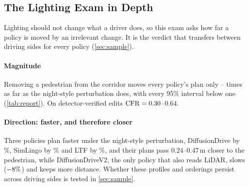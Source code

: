 \subsection{The Lighting Exam in Depth}
\label{sec:lighting}

Lighting should not change what a driver does, so this exam asks how far a policy is moved by an
irrelevant change. It is the verdict that transfers between driving sides for every policy (\cref{sec:sample}).

\paragraph{Magnitude}
Removing a pedestrian from the corridor moves every policy's plan only \NumCFRlo--\NumCFRhi{} times as
far as the night-style perturbation does, with every 95\% interval below one (\cref{tab:report}). On detector-verified edits $\mathrm{CFR}=0.30$--$0.64$.

\paragraph{Direction: faster, and therefore closer}
Three policies plan faster under the night-style perturbation, DiffusionDrive by \NumNightDD\%,
SimLingo by \NumNightSL\% and LTF by \NumNightLTF\%, and their plans pass $0.24$--$0.47$\,m closer to
the pedestrian, while DiffusionDriveV2, the only policy that also reads LiDAR, slows
($-8\%$) and keeps more distance. Whether these profiles and orderings persist across driving sides is tested in \cref{sec:sample}.
